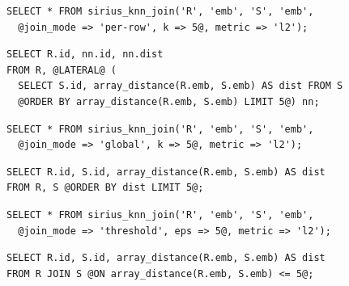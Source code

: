 \begin{table}[t]
    \begin{tcolorbox}
                [vjcard, title={Per-row top-$k$}]
            \begin{lstlisting}[style=vj,label={lst:tvf-per-row}]
SELECT * FROM sirius_knn_join('R', 'emb', 'S', 'emb',
  @join_mode => 'per-row', k => 5@, metric => 'l2');
\end{lstlisting}
            \tcblower
            \begin{lstlisting}[style=vj,label={lst:sql-per-row}]
SELECT R.id, nn.id, nn.dist
FROM R, @LATERAL@ (
  SELECT S.id, array_distance(R.emb, S.emb) AS dist FROM S
  @ORDER BY array_distance(R.emb, S.emb) LIMIT 5@) nn;
\end{lstlisting}
    \end{tcolorbox}

    \begin{tcolorbox}
                [vjcard, title={Global top-$k$}]
            \begin{lstlisting}[style=vj,label={lst:tvf-global}]
SELECT * FROM sirius_knn_join('R', 'emb', 'S', 'emb',
  @join_mode => 'global', k => 5@, metric => 'l2');
\end{lstlisting}
            \tcblower
            \begin{lstlisting}[style=vj,label={lst:sql-global}]
SELECT R.id, S.id, array_distance(R.emb, S.emb) AS dist
FROM R, S @ORDER BY dist LIMIT 5@;
\end{lstlisting}
    \end{tcolorbox}

    \begin{tcolorbox}[vjcard, title={Threshold}]
        \begin{lstlisting}[style=vj,label={lst:tvf-threshold}]
SELECT * FROM sirius_knn_join('R', 'emb', 'S', 'emb',
  @join_mode => 'threshold', eps => 5@, metric => 'l2');
\end{lstlisting}
        \tcblower
        \begin{lstlisting}[style=vj,label={lst:sql-threshold}]
SELECT R.id, S.id, array_distance(R.emb, S.emb) AS dist
FROM R JOIN S @ON array_distance(R.emb, S.emb) <= 5@;
\end{lstlisting}
    \end{tcolorbox}
\end{table}
